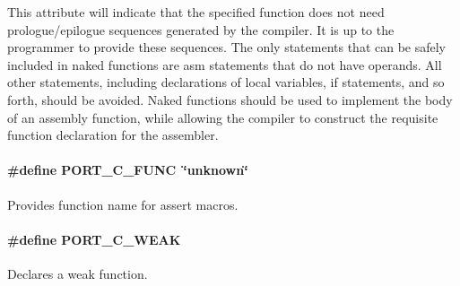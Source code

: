 This attribute will indicate that the specified function does not need prologue/epilogue sequences generated by the compiler. It is up to the programmer to provide these sequences. The only statements that can be safely included in naked functions are {\ttfamily asm} statements that do not have operands. All other statements, including declarations of local variables, {\ttfamily if} statements, and so forth, should be avoided. Naked functions should be used to implement the body of an assembly function, while allowing the compiler to construct the requisite function declaration for the assembler. \hypertarget{group__template__compiler_ga6fe63660c6d0ccbabb032c026714863e}{
\paragraph[{P\-O\-R\-T\-\_\-\-C\-\_\-\-F\-U\-N\-C}]{\setlength{\rightskip}{0pt plus 5cm}\#define P\-O\-R\-T\-\_\-\-C\-\_\-\-F\-U\-N\-C~\char`\"{}unknown\char`\"{}}}\label{group__template__compiler_ga6fe63660c6d0ccbabb032c026714863e}


Provides function name for assert macros. 

\hypertarget{group__template__compiler_ga70c3ad4cff78229fae591d039b59f4d1}{
\paragraph[{P\-O\-R\-T\-\_\-\-C\-\_\-\-W\-E\-A\-K}]{\setlength{\rightskip}{0pt plus 5cm}\#define P\-O\-R\-T\-\_\-\-C\-\_\-\-W\-E\-A\-K}}\label{group__template__compiler_ga70c3ad4cff78229fae591d039b59f4d1}


Declares a weak function. 

